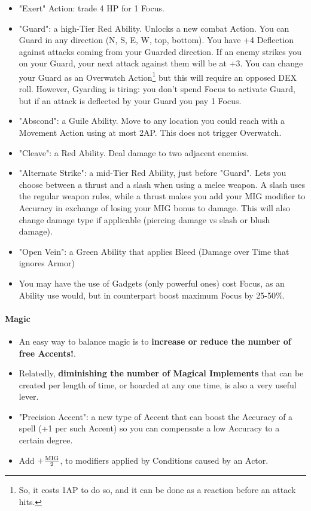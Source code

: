 \begin{itemize}
    \item "Exert" Action: trade 4 HP for 1 Focus.
    \item "Guard": a high-Tier Red Ability. Unlocks a new combat Action. You can Guard in any direction (N, S, E, W, top, bottom). You have +4 Deflection against attacks coming from your Guarded direction. If an enemy strikes you on your Guard, your next attack against them will be at +3. You can change your Guard as an Overwatch Action\footnote{So, it costs 1AP to do so, and it can be done as a reaction before an attack hits.} but this will require an opposed DEX roll. However, Gyarding is tiring: you don't spend Focus to activate Guard, but if an attack is deflected by your Guard you pay 1 Focus.
    \item "Abscond": a Guile Ability. Move to any location you could reach with a Movement Action using at most 2AP. This does not trigger Overwatch.
    \item "Cleave": a Red Ability. Deal damage to two adjacent enemies.
    \item "Alternate Strike": a mid-Tier Red Ability, just before "Guard". Lets you choose between a thrust and a slash when using a melee weapon. A slash uses the regular weapon rules, while a thrust makes you add your MIG modifier to Accuracy in exchange of losing your MIG bonus to damage. This will also change damage type if applicable (piercing damage vs slash or blush damage).
    \item "Open Vein": a Green Ability that applies Bleed (Damage over Time that ignores Armor)
    \item You may have the use of Gadgets (only powerful ones) cost Focus, as an Ability use would, but in counterpart boost maximum Focus by 25-50\%.
\end{itemize}

\paragraph{Magic}

\begin{itemize}
    \item An easy way to balance magic is to \textbf{increase or reduce the number of free Accents!}.
    \item Relatedly, \textbf{diminishing the number of Magical Implements} that can be created per length of time, or hoarded at any one time, is also a very useful lever.
    \item "Precision Accent": a new type of Accent that can boost the Accuracy of a spell (+1 per such Accent) so you can compensate a low Accuracy to a certain degree.
    \item Add $+\frac{\textup{MIG}}{2}$, to modifiers applied by Conditions caused by an Actor.
\end{itemize}


